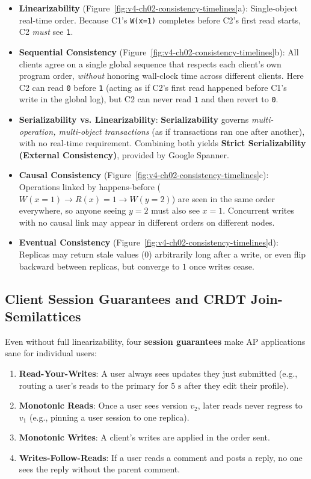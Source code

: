 \begin{itemize}[leftmargin=18pt]
  \item \textbf{Linearizability} (Figure~\ref{fig:v4-ch02-consistency-timelines}a): Single-object real-time order. Because C1's \texttt{W(x=1)} completes before C2's first read starts, C2 \emph{must} see \texttt{1}.
  \item \textbf{Sequential Consistency} (Figure~\ref{fig:v4-ch02-consistency-timelines}b): All clients agree on a single global sequence that respects each client's own program order, \emph{without} honoring wall-clock time across different clients. Here C2 can read \texttt{0} before \texttt{1} (acting as if C2's first read happened before C1's write in the global log), but C2 can never read \texttt{1} and then revert to \texttt{0}.
  \item \textbf{Serializability vs. Linearizability}: \textbf{Serializability} governs \emph{multi-operation, multi-object transactions} (as if transactions ran one after another), with no real-time requirement. Combining both yields \textbf{Strict Serializability (External Consistency)}, provided by Google Spanner.
  \item \textbf{Causal Consistency} (Figure~\ref{fig:v4-ch02-consistency-timelines}c): Operations linked by happens-before ($W(x=1) \to R(x)=1 \to W(y=2)$) are seen in the same order everywhere, so anyone seeing $y=2$ must also see $x=1$. Concurrent writes with no causal link may appear in different orders on different nodes.
  \item \textbf{Eventual Consistency} (Figure~\ref{fig:v4-ch02-consistency-timelines}d): Replicas may return stale values ($0$) arbitrarily long after a write, or even flip backward between replicas, but converge to $1$ once writes cease.
\end{itemize}

\subsection{Client Session Guarantees and CRDT Join-Semilattices}

Even without full linearizability, four \textbf{session guarantees} make AP applications sane for individual users:
\begin{enumerate}[leftmargin=18pt]
  \item \textbf{Read-Your-Writes}: A user always sees updates they just submitted (e.g., routing a user's reads to the primary for $5\text{ s}$ after they edit their profile).
  \item \textbf{Monotonic Reads}: Once a user sees version $v_2$, later reads never regress to $v_1$ (e.g., pinning a user session to one replica).
  \item \textbf{Monotonic Writes}: A client's writes are applied in the order sent.
  \item \textbf{Writes-Follow-Reads}: If a user reads a comment and posts a reply, no one sees the reply without the parent comment.
\end{enumerate}

